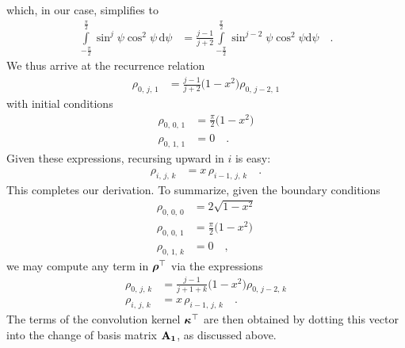 \documentclass[modern]{aastex62}
\begin{document}
%
which, in our case, simplifies to
%
\begin{align}
    \int\limits_{-\frac{\pi}{2}}^{\frac{\pi}{2}}
        \sin^j\psi
        \cos^2\psi \,
    \mathrm{d}\psi
    &=
    \frac{j - 1}{j + 2}\int\limits_{-\frac{\pi}{2}}^
        {\frac{\pi}{2}}\sin^{j-2}\psi \cos^2\psi \mathrm{d}\psi
    \quad.
\end{align}
%
We thus arrive at the recurrence relation
%
\begin{align}
    \rho_{0,\,j,\,1} &= \frac{j - 1}{j + 2} \big(1 - x^2\big) \rho_{0,\,j-2,\,1}
\end{align}
%
with initial conditions
%
\begin{align}
    \rho_{0,\,0,\,1} &= \frac{\pi}{2} \big(1-x^2\big) \nonumber \\
    \rho_{0,\,1,\,1} &= 0 \quad.
\end{align}
%
Given these expressions, recursing upward in $i$ is easy:
%
\begin{align}
    \rho_{i,\,j,\,k} &= x \, \rho_{i-1,\,j,\,k} \quad.
\end{align}
%
This completes our derivation. To summarize, given the boundary conditions
%
\begin{align}
    \rho_{0,\,0,\,0} &= 2 \sqrt{1-x^2} \nonumber \\
    \rho_{0,\,0,\,1} &= \frac{\pi}{2} \big(1-x^2\big) \nonumber \\
    \rho_{0,\,1,\,k} &= 0 \quad ,
\end{align}
%
we may compute any term in $\boldsymbol{\rho}^\top$ via the expressions
%
\begin{align}
    \label{eq:kT:sTrecurrence}
    \rho_{0,\,j,\,k} &= \frac{j - 1}{j + 1 + k} \big(1 - x^2\big) \rho_{0,\,j-2,\,k} \nonumber \\
    \rho_{i,\,j,\,k} &= x \, \rho_{i-1,\,j,\,k} \quad.
\end{align}
%
The terms of the convolution kernel $\boldsymbol{\kappa}^\top$ are then obtained by dotting
this vector into the change of basis matrix ${\mathbf{A_1}}$, as discussed above.
\end{document}
